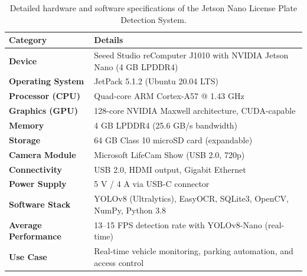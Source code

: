 \begin{table}[h!]
	\centering
	\renewcommand{\arraystretch}{1.4} %
	\setlength{\tabcolsep}{10pt} %
	
	\begin{tcolorbox}[
		colback=gray!3!white,
		colframe=blue!60!black,
		title={\faMicrochip\hspace{0.5em}System Specifications},
		fonttitle=\bfseries,
		arc=3mm,
		boxrule=1pt,
		width=\textwidth-1cm, %
		left=5mm, right=5mm, top=3mm, bottom=3mm
		]
		\newlength{\specwidth}
		\setlength{\specwidth}{\dimexpr\textwidth-0.5cm\relax}
\begin{tabularx}{\specwidth}{|>{\raggedright\arraybackslash}p{4cm}|X|}
			\hline
			\rowcolor{blue!10}
			\textbf{Category} & \textbf{Details} \\ \hline
			
			\textbf{Device} & Seeed Studio reComputer J1010 with NVIDIA Jetson Nano (4 GB LPDDR4) \\ \hline
			\textbf{Operating System} & JetPack 5.1.2 (Ubuntu 20.04 LTS) \\ \hline
			\textbf{Processor (CPU)} & Quad-core ARM Cortex-A57 @ 1.43 GHz \\ \hline
			\textbf{Graphics (GPU)} & 128-core NVIDIA Maxwell architecture, CUDA-capable \\ \hline
			\textbf{Memory} & 4 GB LPDDR4 (25.6 GB/s bandwidth) \\ \hline
			\textbf{Storage} & 64 GB Class 10 microSD card (expandable) \\ \hline
			\textbf{Camera Module} & Microsoft LifeCam Show (USB 2.0, 720p) \\ \hline
			\textbf{Connectivity} & USB 2.0, HDMI output, Gigabit Ethernet \\ \hline
			\textbf{Power Supply} & 5 V / 4 A via USB-C connector \\ \hline
			\textbf{Software Stack} & YOLOv8 (Ultralytics), EasyOCR, SQLite3, OpenCV, NumPy, Python 3.8 \\ \hline
			\textbf{Average Performance} & 13–15 FPS detection rate with YOLOv8-Nano (real-time) \\ \hline
			\textbf{Use Case} & Real-time vehicle monitoring, parking automation, and access control \\ \hline
			
		\end{tabularx}
	\end{tcolorbox}
	
	\caption{Detailed hardware and software specifications of the Jetson Nano License Plate Detection System.}
	\label{tab:specifications}
\end{table}